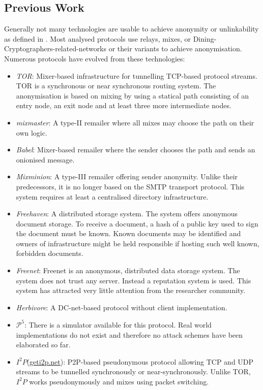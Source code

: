 \documentclass[9pt,journal,compsoc]{IEEEtran}
\begin{document}
\subsection{Previous Work}
Generally not many technologies are usable to achieve anonymity or unlinkability as defined in \cite{anon_terminology}. Most analysed protocols use relays\cite{CHAUM1}, mixes\cite{CHAUM1}, or Dining-Cryptographers-related-networks\cite{chaum-dc} or their variants to achieve anonymisation. Numerous protocols have evolved from these technologies:
\begin{itemize}
	\item \emph{TOR}\cite{tor-design}: Mixer-based infrastructure for tunnelling TCP-based protocol streams. TOR is a synchronous or near synchronous routing system. The anonymisation is based on mixing by using a statical path consisting of an entry node, an exit node and at least three more intermediate nodes.
	\item \emph{mixmaster}\cite{mixmaster-spec}: A type-II remailer where all mixes may choose the path on their own logic.
	\item \emph{Babel}\cite{babel}: Mixer-based remailer where the sender chooses the path and sends an onionised message.
	\item \emph{Mixminion}\cite{minion-design}: A type-III remailer offering sender anonymity. Unlike their predecessors, it is no longer based on the SMTP transport protocol. This system requires at least a centralised directory infrastructure.
	\item \emph{Freehaven}\cite{freehaven-berk}: A distributed storage system. The system offers anonymous document storage. To receive a document, a hash of a public key used to sign the document must be known. Known documents may be identified and owners of infrastructure might be held responsible if hosting such well known, forbidden documents.
	\item \emph{Freenet}\cite{freenet}: Freenet is an anonymous, distributed data storage system. The system does not trust any server. Instead a reputation system is used. This system has attracted very little attention from the researcher community.
	\item \emph{Herbivore}\cite{herbivore:tr}: A DC-net-based protocol without client implementation.
	\item \emph{$\mathcal{P}^5$}\cite{sherwood2005p5}: There is a simulator available for this protocol. Real world implementations do not exist and therefore no attack schemes have been elaborated so far.
	\item \emph{$I^2P$}(\href{https://geti2p.net/}{geti2p.net}): P2P-based pseudonymous protocol allowing TCP and UDP streams to be tunnelled synchronously or near-synchronously. Unlike TOR, $I^2P$ works pseudonymously and mixes using packet switching. 
\end{itemize}
\end{document}
